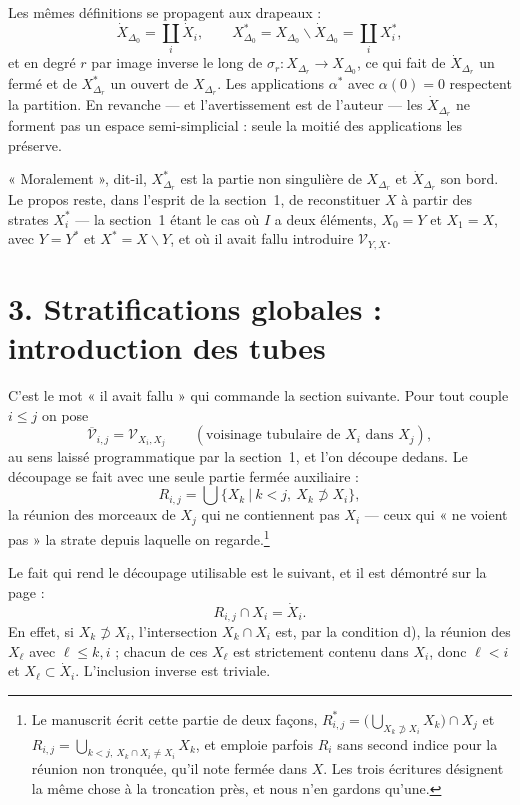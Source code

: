 \documentclass[11pt,a4paper]{article}
\begin{document}
Les mêmes définitions se propagent aux drapeaux :
\[
  \dot{X}_{\Delta_{0}} = \coprod_{i} \dot{X}_{i}, \qquad
  X^{*}_{\Delta_{0}} = X_{\Delta_{0}} \smallsetminus \dot{X}_{\Delta_{0}}
  = \coprod_{i} X_{i}^{*},
\]
et en degré $r$ par image inverse le long de
$\sigma_{r} \colon X_{\Delta_{r}} \to X_{\Delta_{0}}$, ce qui fait de
$\dot{X}_{\Delta_{r}}$ un fermé et de $X^{*}_{\Delta_{r}}$ un ouvert de
$X_{\Delta_{r}}$. Les applications $\alpha^{*}$ avec $\alpha(0) = 0$ respectent
la partition. En revanche — et l'avertissement est de l'auteur — les
$\dot{X}_{\Delta_{r}}$ ne forment pas un espace semi-simplicial : seule la moitié
des applications les préserve.

« Moralement », dit-il, $X^{*}_{\Delta_{r}}$ est la partie non singulière de
$X_{\Delta_{r}}$ et $\dot{X}_{\Delta_{r}}$ son bord. Le propos reste, dans
l'esprit de la section~1, de reconstituer $X$ à partir des strates $X_{i}^{*}$ —
la section~1 étant le cas où $I$ a deux éléments, $X_{0} = Y$ et $X_{1} = X$,
avec $Y = Y^{*}$ et $X^{*} = X \smallsetminus Y$, et où il avait fallu
introduire $\mathcal{V}_{Y,X}$.

\section*{3. Stratifications globales : introduction des tubes}

C'est le mot « il avait fallu » qui commande la section suivante. Pour tout
couple $i \leq j$ on pose
\[
  \overline{\mathcal{V}}_{i,j} = \mathcal{V}_{X_{i},X_{j}}
  \qquad (\text{voisinage tubulaire de } X_{i} \text{ dans } X_{j}),
\]
au sens laissé programmatique par la section~1, et l'on découpe dedans. Le
découpage se fait avec une seule partie fermée auxiliaire :
\[
  R_{i,j} = \bigcup \bigl\{ X_{k} \ \big|\ k < j,\ X_{k} \not\supset X_{i} \bigr\},
\]
la réunion des morceaux de $X_{j}$ qui ne contiennent pas $X_{i}$ — ceux qui
« ne voient pas » la strate depuis laquelle on
regarde.\footnote{Le manuscrit écrit cette partie de deux façons, $R^{*}_{i,j} =
\bigl(\bigcup_{X_{k} \not\supset X_{i}} X_{k}\bigr) \cap X_{j}$ et
$R_{i,j} = \bigcup_{k<j,\ X_{k} \cap X_{i} \neq X_{i}} X_{k}$, et emploie parfois
$R_{i}$ sans second indice pour la réunion non tronquée, qu'il note fermée dans
$X$. Les trois écritures désignent la même chose à la troncation près, et nous
n'en gardons qu'une.}

Le fait qui rend le découpage utilisable est le suivant, et il est démontré sur
la page :
\[
  R_{i,j} \cap X_{i} = \dot{X}_{i}.
\]
En effet, si $X_{k} \not\supset X_{i}$, l'intersection $X_{k} \cap X_{i}$ est,
par la condition d), la réunion des $X_{\ell}$ avec $\ell \leq k,i$ ; chacun de
ces $X_{\ell}$ est strictement contenu dans $X_{i}$, donc $\ell < i$ et
$X_{\ell} \subset \dot{X}_{i}$. L'inclusion inverse est triviale.
\end{document}
